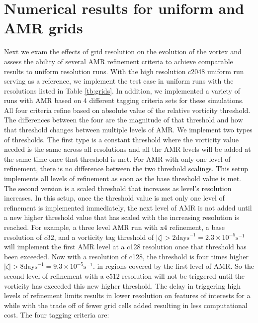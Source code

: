 \section{Numerical results for uniform and AMR grids}
Next we exam the effects of grid resolution on the evolution of the vortex and assess 
the ability of several AMR refinement criteria to achieve comparable results to uniform
resolution runs. With the high resolution c2048 uniform run serving as a reference,
we implement the test case in uniform runs with the resolutions listed in Table \ref{tb:grids}.
In addition, we implemented a variety of runs with AMR based on 
4 different tagging criteria sets for these simulations. 
All four criteria refine based on absolute value of the relative 
vorticity threshold. The differences between the four are the magnitude of that 
threshold and how that threshold changes between multiple
levels of AMR. We implement two types of thresholds.
The first type is a constant threshold where the vorticity value needed is the same 
across all resolutions and all the AMR levels will be added at the same time once that
threshold is met. For AMR with only one level of refinement, there is no difference between
the two threshold scalings. This setup implements all levels of refinement as soon as the 
base threshold value is met.
The second version is a scaled threshold that increases as level's resolution increases.
In this setup, once the threshold value is met only one level of refinement is implemented
immediately, the next level of AMR is not added until a new higher threshold value that
has scaled with the increasing resolution is reached.
For example, a three level AMR run with x4 refinement, a base resolution of $c32$, 
and a vorticity tag threshold of 
$|\zeta| > 2 \mathrm{days}^{-1} = 2.3 \times 10^{-5} \mathrm{s}^{-1}$ will implement
the first AMR level at a c128 resolution once that threshold has been exceeded. Now with
a resolution of c128, the threshold is four times higher 
$|\zeta| > 8 \mathrm{days}^{-1} = 9.3 \times 10^{-5} \mathrm{s}^{-1}$. 
in regions covered by the first level of AMR. So the second
level of refinement with a c512 resolution will not be triggered until the vorticity has 
exceeded this new higher threshold. The delay in triggering high levels of refinement
limits results in lower resolution on features of interests for a while with the trade off of
fewer grid cells added resulting in less computational cost.
The four tagging criteria are:
